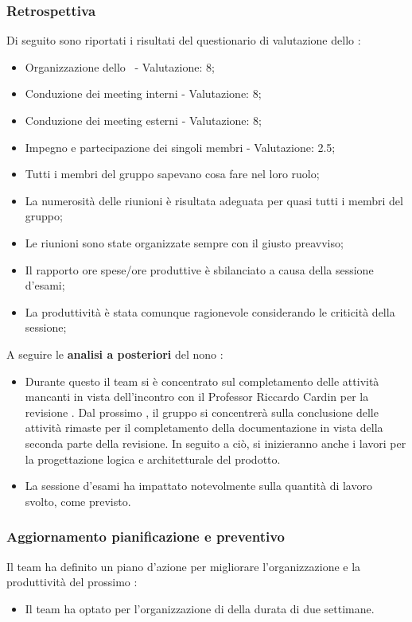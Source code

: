 \subsubsection{Retrospettiva}

\par Di seguito sono riportati i risultati del questionario di valutazione dello :
\begin{itemize}
  \item Organizzazione dello \ - Valutazione: 8;
  \item Conduzione dei meeting interni - Valutazione: 8;
  \item Conduzione dei meeting esterni - Valutazione: 8;
  \item Impegno e partecipazione dei singoli membri - Valutazione: 2.5;
  \item Tutti i membri del gruppo sapevano cosa fare nel loro ruolo;
  \item La numerosità delle riunioni è risultata adeguata per quasi tutti i membri del gruppo;
  \item Le riunioni sono state organizzate sempre con il giusto preavviso;
  \item Il rapporto ore spese/ore produttive è sbilanciato a causa della sessione d'esami;
  \item La produttività è stata comunque ragionevole considerando le criticità della sessione;
\end{itemize}

\vspace{0.5\baselineskip}
\par A seguire le \textbf{analisi a posteriori} del nono :
\begin{itemize}
  \item Durante questo  il team si è concentrato sul completamento delle attività mancanti in vista dell'incontro con il Professor Riccardo Cardin per la revisione \RTB. Dal prossimo , il gruppo si concentrerà sulla conclusione delle attività rimaste per il completamento della documentazione in vista della seconda parte della revisione. In seguito a ciò, si inizieranno anche i lavori per la progettazione logica e architetturale del prodotto.
  \item La sessione d'esami ha impattato notevolmente sulla quantità di lavoro svolto, come previsto. 
\end{itemize}

\subsubsection{Aggiornamento pianificazione e preventivo}
\par Il team ha definito un piano d'azione per migliorare l'organizzazione e la produttività del prossimo :
\begin{itemize}
  \item Il team ha optato per l'organizzazione di  della durata di due settimane.
\end{itemize}


